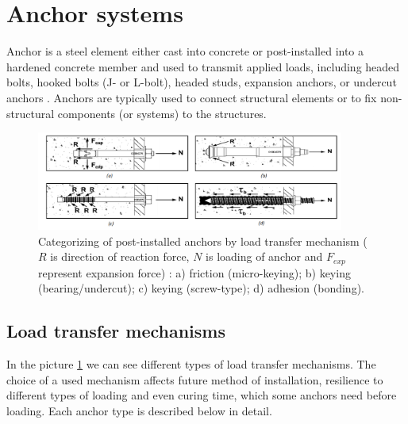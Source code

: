\section{Anchor systems}
Anchor is a steel element either cast into concrete or post-installed into a hardened concrete member and used to transmit applied loads, including headed bolts, hooked bolts (J- or L-bolt), headed studs, expansion anchors, or undercut anchors \cite{anchors-ACI-318M}. Anchors are typically used to connect structural elements or to fix non-structural components (or systems) to the structures. 

\begin{figure}[h!]
	\centering
	\includegraphics[width=0.9\textwidth]{obrazky/post_installed_anchor_types_repaired.png}
	\caption[Categorizing of post-installed anchors by load transfer mechanism]{Categorizing of post-installed anchors by load transfer mechanism ($R$ is direction of reaction force, $N$ is loading of anchor and $F_{exp}$ represent expansion force) \cite{hilti_anchors}: a) friction (micro-keying); b) keying (bearing/undercut); c) keying (screw-type); d) adhesion (bonding).}\label{obr:Post_installed_anchors}
\end{figure}

\subsection{Load transfer mechanisms}
In the picture \ref{obr:Post_installed_anchors} we can see different types of load transfer mechanisms. The choice of a  used mechanism affects future method of installation, resilience to different types of loading and even curing time, which some anchors need before loading. Each anchor type is described below in detail. 


